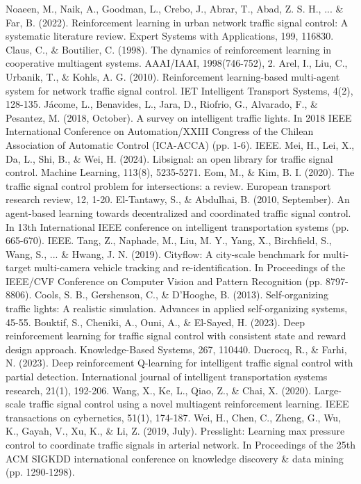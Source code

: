 \documentclass[conference]{IEEEtran}
\begin{document}
\begin{thebibliography}{00}
 Noaeen, M., Naik, A., Goodman, L., Crebo, J., Abrar, T., Abad, Z. S. H., ... \& Far, B. (2022). Reinforcement learning in urban network traffic signal control: A systematic literature review. Expert Systems with Applications, 199, 116830.
 Claus, C., \& Boutilier, C. (1998). The dynamics of reinforcement learning in cooperative multiagent systems. AAAI/IAAI, 1998(746-752), 2.
 Arel, I., Liu, C., Urbanik, T., \& Kohls, A. G. (2010). Reinforcement learning-based multi-agent system for network traffic signal control. IET Intelligent Transport Systems, 4(2), 128-135.
 Jácome, L., Benavides, L., Jara, D., Riofrio, G., Alvarado, F., \& Pesantez, M. (2018, October). A survey on intelligent traffic lights. In 2018 IEEE International Conference on Automation/XXIII Congress of the Chilean Association of Automatic Control (ICA-ACCA) (pp. 1-6). IEEE.
 Mei, H., Lei, X., Da, L., Shi, B., \& Wei, H. (2024). Libsignal: an open library for traffic signal control. Machine Learning, 113(8), 5235-5271.
 Eom, M., \& Kim, B. I. (2020). The traffic signal control problem for intersections: a review. European transport research review, 12, 1-20.
 El-Tantawy, S., \& Abdulhai, B. (2010, September). An agent-based learning towards decentralized and coordinated traffic signal control. In 13th International IEEE conference on intelligent transportation systems (pp. 665-670). IEEE.
 Tang, Z., Naphade, M., Liu, M. Y., Yang, X., Birchfield, S., Wang, S., ... \& Hwang, J. N. (2019). Cityflow: A city-scale benchmark for multi-target multi-camera vehicle tracking and re-identification. In Proceedings of the IEEE/CVF Conference on Computer Vision and Pattern Recognition (pp. 8797-8806).
 Cools, S. B., Gershenson, C., \& D’Hooghe, B. (2013). Self-organizing traffic lights: A realistic simulation. Advances in applied self-organizing systems, 45-55.
 Bouktif, S., Cheniki, A., Ouni, A., \& El-Sayed, H. (2023). Deep reinforcement learning for traffic signal control with consistent state and reward design approach. Knowledge-Based Systems, 267, 110440.
 Ducrocq, R., \& Farhi, N. (2023). Deep reinforcement Q-learning for intelligent traffic signal control with partial detection. International journal of intelligent transportation systems research, 21(1), 192-206.
 Wang, X., Ke, L., Qiao, Z., \& Chai, X. (2020). Large-scale traffic signal control using a novel multiagent reinforcement learning. IEEE transactions on cybernetics, 51(1), 174-187.
 Wei, H., Chen, C., Zheng, G., Wu, K., Gayah, V., Xu, K., \& Li, Z. (2019, July). Presslight: Learning max pressure control to coordinate traffic signals in arterial network. In Proceedings of the 25th ACM SIGKDD international conference on knowledge discovery \& data mining (pp. 1290-1298).

\end{thebibliography}
\end{document}

